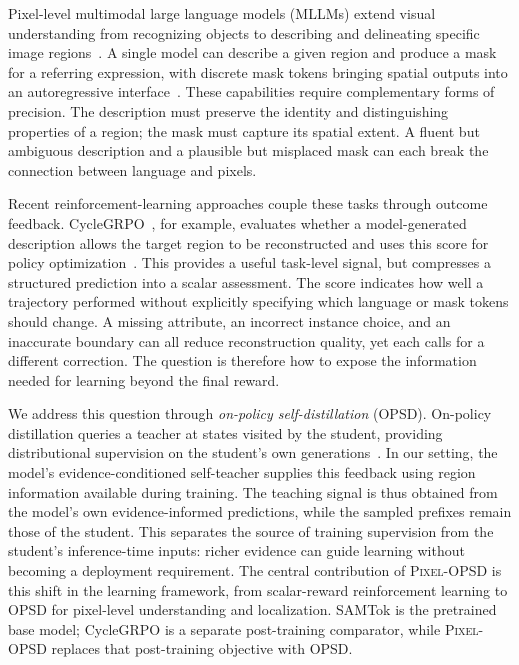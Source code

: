 \documentclass{article}
\newcommand{\ours}{\textsc{Pixel-OPSD}}
\begin{document}
Pixel-level multimodal large language models (MLLMs) extend visual understanding from recognizing objects to describing and delineating specific image regions~\citep{lai2024lisa,li2024pixellm,rasheed2024glamm}. A single model can describe a given region and produce a mask for a referring expression, with discrete mask tokens bringing spatial outputs into an autoregressive interface~\citep{zhou2026samtok}. These capabilities require complementary forms of precision. The description must preserve the identity and distinguishing properties of a region; the mask must capture its spatial extent. A fluent but ambiguous description and a plausible but misplaced mask can each break the connection between language and pixels.

Recent reinforcement-learning approaches couple these tasks through outcome feedback. CycleGRPO~\citep{zhang2026cyclegrpo}, for example, evaluates whether a model-generated description allows the target region to be reconstructed and uses this score for policy optimization~\citep{shulman2017ppo}. This provides a useful task-level signal, but compresses a structured prediction into a scalar assessment. The score indicates how well a trajectory performed without explicitly specifying which language or mask tokens should change. A missing attribute, an incorrect instance choice, and an inaccurate boundary can all reduce reconstruction quality, yet each calls for a different correction. The question is therefore how to expose the information needed for learning beyond the final reward.

We address this question through \emph{on-policy self-distillation} (OPSD). On-policy distillation queries a teacher at states visited by the student, providing distributional supervision on the student's own generations~\citep{agarwal2024gkd}. In our setting, the model's evidence-conditioned self-teacher supplies this feedback using region information available during training. The teaching signal is thus obtained from the model's own evidence-informed predictions, while the sampled prefixes remain those of the student. This separates the source of training supervision from the student's inference-time inputs: richer evidence can guide learning without becoming a deployment requirement. The central contribution of \ours{} is this shift in the learning framework, from scalar-reward reinforcement learning to OPSD for pixel-level understanding and localization. SAMTok is the pretrained base model; CycleGRPO is a separate post-training comparator, while \ours{} replaces that post-training objective with OPSD.
\end{document}
